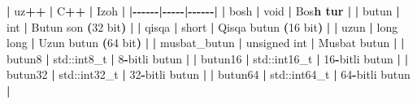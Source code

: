 \documentclass[a4paper,11pt,twoside,openright]{book}
\newenvironment{Shaded}{\begin{snugshade}}{\end{snugshade}}
\newcommand{\BuiltInTok}[1]{#1}
\newcommand{\CharTok}[1]{\textcolor[rgb]{0.31,0.60,0.02}{#1}}
\newcommand{\DecValTok}[1]{\textcolor[rgb]{0.00,0.00,0.81}{#1}}
\newcommand{\ErrorTok}[1]{\textcolor[rgb]{0.64,0.00,0.00}{\textbf{#1}}}
\newcommand{\NormalTok}[1]{#1}
\newcommand{\OperatorTok}[1]{\textcolor[rgb]{0.81,0.36,0.00}{\textbf{#1}}}
\begin{document}
\begin{Shaded}
\begin{Highlighting}[]
\OperatorTok{|}\NormalTok{ uz}\OperatorTok{++} \OperatorTok{|}\NormalTok{ C}\OperatorTok{++} \OperatorTok{|}\NormalTok{ Izoh }\OperatorTok{|}
\OperatorTok{|{-}{-}{-}{-}{-}{-}|{-}{-}{-}{-}{-}|{-}{-}{-}{-}{-}{-}|}
\OperatorTok{|} \ErrorTok{\textasciigrave{}}\NormalTok{bosh}\ErrorTok{\textasciigrave{}} \OperatorTok{|} \ErrorTok{\textasciigrave{}}\NormalTok{void}\ErrorTok{\textasciigrave{}} \OperatorTok{|}\NormalTok{ Bo}\CharTok{\textquotesingle{}s}\ErrorTok{h tur |}
\OperatorTok{|} \ErrorTok{\textasciigrave{}}\NormalTok{butun}\ErrorTok{\textasciigrave{}} \OperatorTok{|} \ErrorTok{\textasciigrave{}}\NormalTok{int}\ErrorTok{\textasciigrave{}} \OperatorTok{|}\NormalTok{ Butun son }\OperatorTok{(}\DecValTok{32}\NormalTok{ bit}\OperatorTok{)} \OperatorTok{|}
\OperatorTok{|} \ErrorTok{\textasciigrave{}}\NormalTok{qisqa}\ErrorTok{\textasciigrave{}} \OperatorTok{|} \ErrorTok{\textasciigrave{}}\NormalTok{short}\ErrorTok{\textasciigrave{}} \OperatorTok{|}\NormalTok{ Qisqa butun }\OperatorTok{(}\DecValTok{16}\NormalTok{ bit}\OperatorTok{)} \OperatorTok{|}
\OperatorTok{|} \ErrorTok{\textasciigrave{}}\NormalTok{uzun}\ErrorTok{\textasciigrave{}} \OperatorTok{|} \ErrorTok{\textasciigrave{}}\NormalTok{long long}\ErrorTok{\textasciigrave{}} \OperatorTok{|}\NormalTok{ Uzun butun }\OperatorTok{(}\DecValTok{64}\NormalTok{ bit}\OperatorTok{)} \OperatorTok{|}
\OperatorTok{|} \ErrorTok{\textasciigrave{}}\NormalTok{musbat\_butun}\ErrorTok{\textasciigrave{}} \OperatorTok{|} \ErrorTok{\textasciigrave{}}\NormalTok{unsigned int}\ErrorTok{\textasciigrave{}} \OperatorTok{|}\NormalTok{ Musbat butun }\OperatorTok{|}
\OperatorTok{|} \ErrorTok{\textasciigrave{}}\NormalTok{butun8}\ErrorTok{\textasciigrave{}} \OperatorTok{|} \ErrorTok{\textasciigrave{}}\BuiltInTok{std::}\NormalTok{int8\_t}\ErrorTok{\textasciigrave{}} \OperatorTok{|} \DecValTok{8}\OperatorTok{{-}}\NormalTok{bitli butun }\OperatorTok{|}
\OperatorTok{|} \ErrorTok{\textasciigrave{}}\NormalTok{butun16}\ErrorTok{\textasciigrave{}} \OperatorTok{|} \ErrorTok{\textasciigrave{}}\BuiltInTok{std::}\NormalTok{int16\_t}\ErrorTok{\textasciigrave{}} \OperatorTok{|} \DecValTok{16}\OperatorTok{{-}}\NormalTok{bitli butun }\OperatorTok{|}
\OperatorTok{|} \ErrorTok{\textasciigrave{}}\NormalTok{butun32}\ErrorTok{\textasciigrave{}} \OperatorTok{|} \ErrorTok{\textasciigrave{}}\BuiltInTok{std::}\NormalTok{int32\_t}\ErrorTok{\textasciigrave{}} \OperatorTok{|} \DecValTok{32}\OperatorTok{{-}}\NormalTok{bitli butun }\OperatorTok{|}
\OperatorTok{|} \ErrorTok{\textasciigrave{}}\NormalTok{butun64}\ErrorTok{\textasciigrave{}} \OperatorTok{|} \ErrorTok{\textasciigrave{}}\BuiltInTok{std::}\NormalTok{int64\_t}\ErrorTok{\textasciigrave{}} \OperatorTok{|} \DecValTok{64}\OperatorTok{{-}}\NormalTok{bitli butun }\OperatorTok{|}

\end{Highlighting}
\end{Shaded}
\end{document}
